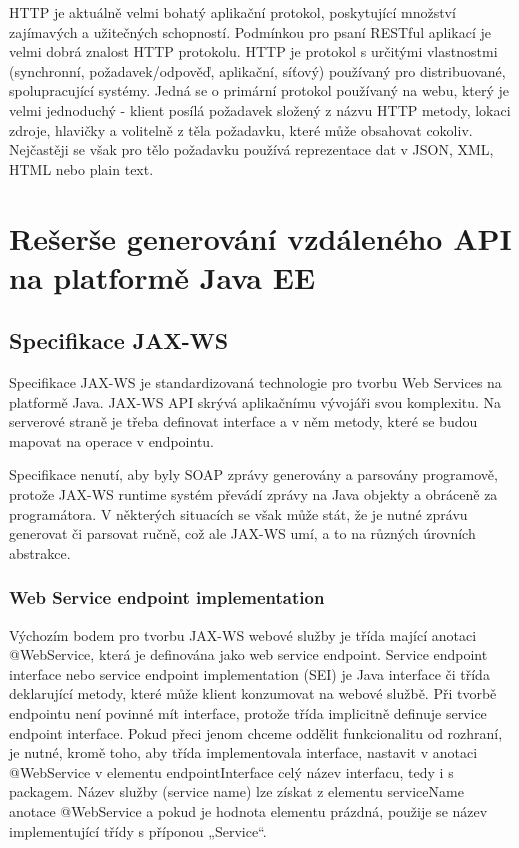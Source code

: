 \documentclass[11pt,twoside,a4paper]{book}
\begin{document}
HTTP je aktuálně velmi bohatý aplikační protokol, poskytující množství zajímavých a
užitečných schopností. Podmínkou pro psaní RESTful aplikací je velmi dobrá znalost HTTP
protokolu. HTTP je protokol s určitými vlastnostmi (synchronní, požadavek/odpověď,
aplikační, síťový) používaný pro distribuované, spolupracující systémy. Jedná se o primární
protokol používaný na webu, který je velmi jednoduchý - klient posílá požadavek složený z
názvu HTTP metody, lokaci zdroje, hlavičky a volitelně z těla požadavku, které může
obsahovat cokoliv. Nejčastěji se však pro tělo požadavku používá reprezentace dat v JSON,
XML, HTML nebo plain text.

\section{Rešerše generování vzdáleného API na platformě Java EE}

\subsection{Specifikace JAX-WS}
Specifikace JAX-WS je standardizovaná technologie pro tvorbu Web Services na platformě
Java. JAX-WS API skrývá aplikačnímu vývojáři svou komplexitu. Na serverové straně je
třeba definovat interface a v něm metody, které se budou mapovat na operace v endpointu.

Specifikace nenutí, aby byly SOAP zprávy generovány a parsovány programově, protože
JAX-WS runtime systém převádí zprávy na Java objekty a obráceně za programátora. V
některých situacích se však může stát, že je nutné zprávu generovat či parsovat ručně, což ale
JAX-WS umí, a to na různých úrovních abstrakce.

\subsubsection{Web Service endpoint implementation}
Výchozím bodem pro tvorbu JAX-WS webové služby je třída mající anotaci @WebService,
která je definována jako web service endpoint. Service endpoint interface nebo service
endpoint implementation (SEI) je Java interface či třída deklarující metody, které může klient
konzumovat na webové službě. Při tvorbě endpointu není povinné mít interface, protože třída
implicitně definuje service endpoint interface. Pokud přeci jenom chceme oddělit
funkcionalitu od rozhraní, je nutné, kromě toho, aby třída implementovala interface, nastavit v
anotaci @WebService v elementu endpointInterface celý název interfacu, tedy i s packagem.
Název služby (service name) lze získat z elementu serviceName anotace @WebService a
pokud je hodnota elementu prázdná, použije se název implementující třídy s příponou
„Service“.
\end{document}

